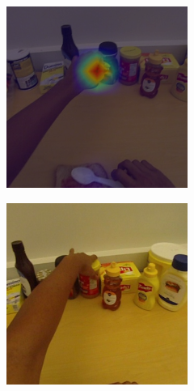 \documentclass[10pt,twocolumn,hidelinks,letterpaper]{article}
\begin{document}
\begin{figure}[t]
\begin{subfigure}{.32\linewidth}
  \end{subfigure}
  \begin{subfigure}{.32\linewidth}
  	\includegraphics[width=\linewidth]{images/Cams3/S2_take_peanut/rgb0004_CAM_MS.png}
  \end{subfigure}
  \begin{subfigure}{.32\linewidth}
  	\includegraphics[width=\linewidth]{images/Cams3/S2_take_peanut/rgb0010.png}

\end{subfigure}
\end{figure}
\end{document}
